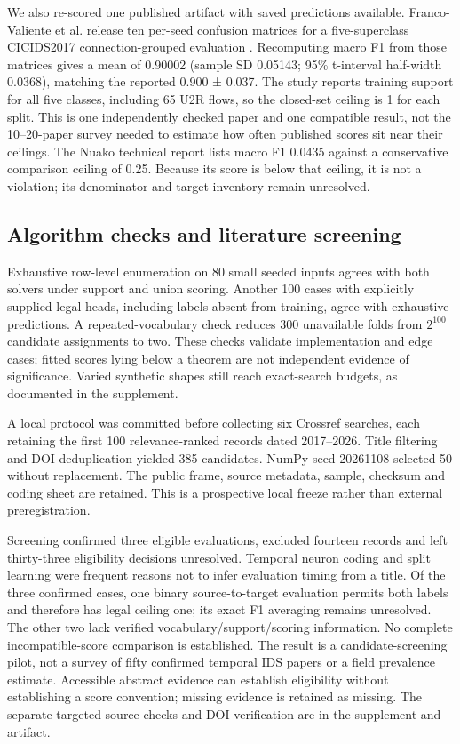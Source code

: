 \documentclass[journal]{IEEEtran}
\begin{document}
We also re-scored one published artifact with saved predictions available. Franco-Valiente et al. release ten per-seed confusion matrices for a five-superclass CICIDS2017 connection-grouped evaluation \cite{francovaliente2026}. Recomputing macro F1 from those matrices gives a mean of 0.90002 (sample SD 0.05143; 95\% t-interval half-width 0.0368), matching the reported 0.900 ± 0.037. The study reports training support for all five classes, including 65 U2R flows, so the closed-set ceiling is 1 for each split. This is one independently checked paper and one compatible result, not the 10--20-paper survey needed to estimate how often published scores sit near their ceilings. The Nuako technical report lists macro F1 0.0435 against a conservative comparison ceiling of 0.25. Because its score is below that ceiling, it is not a violation; its denominator and target inventory remain unresolved.

\subsection{Algorithm checks and literature screening}
Exhaustive row-level enumeration on 80 small seeded inputs agrees with both solvers under support and union scoring. Another 100 cases with explicitly supplied legal heads, including labels absent from training, agree with exhaustive predictions. A repeated-vocabulary check reduces 300 unavailable folds from \(2^{100}\) candidate assignments to two. These checks validate implementation and edge cases; fitted scores lying below a theorem are not independent evidence of significance. Varied synthetic shapes still reach exact-search budgets, as documented in the supplement.

A local protocol was committed before collecting six Crossref searches, each retaining the first 100 relevance-ranked records dated 2017--2026. Title filtering and DOI deduplication yielded 385 candidates. NumPy seed 20261108 selected 50 without replacement. The public frame, source metadata, sample, checksum and coding sheet are retained. This is a prospective local freeze rather than external preregistration.

Screening confirmed three eligible evaluations, excluded fourteen records and left thirty-three eligibility decisions unresolved. Temporal neuron coding and split learning were frequent reasons not to infer evaluation timing from a title. Of the three confirmed cases, one binary source-to-target evaluation permits both labels and therefore has legal ceiling one; its exact F1 averaging remains unresolved. The other two lack verified vocabulary/support/scoring information. No complete incompatible-score comparison is established. The result is a candidate-screening pilot, not a survey of fifty confirmed temporal IDS papers or a field prevalence estimate. Accessible abstract evidence can establish eligibility without establishing a score convention; missing evidence is retained as missing. The separate targeted source checks and DOI verification are in the supplement and artifact.
\end{document}
